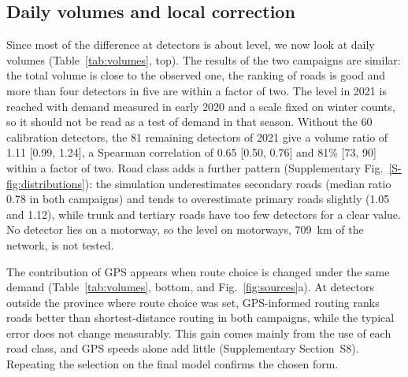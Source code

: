 \documentclass[preprint,11pt,a4paper]{elsarticle}
\begin{document}
\subsection{Daily volumes and local correction}
Since most of the difference at detectors is about level, we now look at daily volumes (Table~\ref{tab:volumes}, top). The results of the two campaigns are similar: the total volume is close to the observed one, the ranking of roads is good and more than four detectors in five are within a factor of two. The level in 2021 is reached with demand measured in early 2020 and a scale fixed on winter counts, so it should not be read as a test of demand in that season. Without the 60 calibration detectors, the 81 remaining detectors of 2021 give a volume ratio of 1.11 [0.99, 1.24], a Spearman correlation of 0.65 [0.50, 0.76] and 81\% [73, 90] within a factor of two. Road class adds a further pattern (Supplementary Fig.~\ref{S-fig:distributions}): the simulation underestimates secondary roads (median ratio 0.78 in both campaigns) and tends to overestimate primary roads slightly (1.05 and 1.12), while trunk and tertiary roads have too few detectors for a clear value. No detector lies on a motorway, so the level on motorways, 709~km of the network, is not tested.

The contribution of GPS appears when route choice is changed under the same demand (Table~\ref{tab:volumes}, bottom, and Fig.~\ref{fig:sources}a). At detectors outside the province where route choice was set, GPS-informed routing ranks roads better than shortest-distance routing in both campaigns, while the typical error does not change measurably. This gain comes mainly from the use of each road class, and GPS speeds alone add little (Supplementary Section~S8). Repeating the selection on the final model confirms the chosen form.
\end{document}
